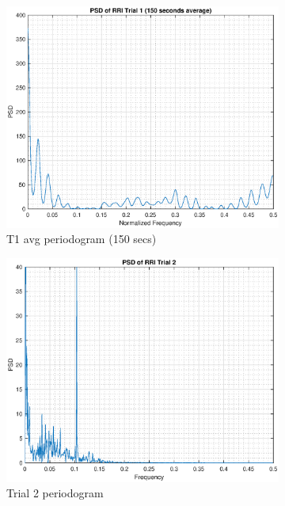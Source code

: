 \documentclass{article}
\begin{document}
\begin{figure}[h!]
\begin{subfigure}{0.32\textwidth}
\centering
\includegraphics[width = \textwidth]{rr_t1_150}
\caption{T1 avg periodogram (150 secs)}
\label{fig:rr_t1_150}
\end{subfigure}
\begin{subfigure}{0.32\textwidth}
\centering
\includegraphics[width = \textwidth]{rr_t2}
\caption{Trial 2 periodogram}
\label{fig:rr_t2}
\end{subfigure}
\begin{subfigure}{0.32\textwidth}
\centering

\end{subfigure}
\end{figure}
\end{document}
